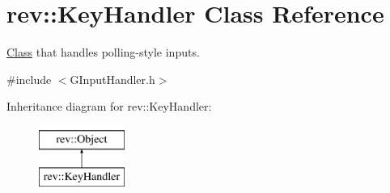 \hypertarget{classrev_1_1_key_handler}{}\section{rev\+::Key\+Handler Class Reference}
\label{classrev_1_1_key_handler}


\mbox{\hyperlink{struct_class}{Class}} that handles polling-\/style inputs.  




{\ttfamily \#include $<$G\+Input\+Handler.\+h$>$}

Inheritance diagram for rev\+::Key\+Handler\+:\begin{figure}[H]
\begin{center}
\leavevmode
\includegraphics[height=2.000000cm]{classrev_1_1_key_handler}
\end{center}
\end{figure}
